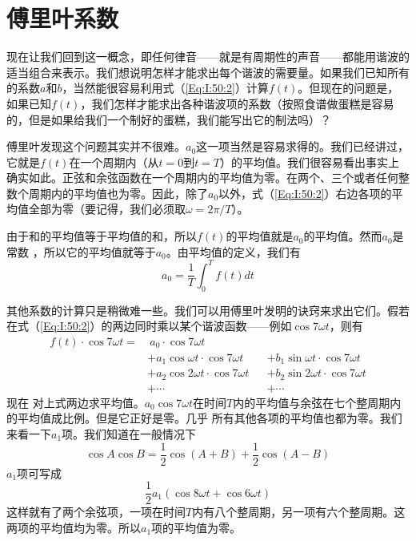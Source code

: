 \section{傅里叶系数}

现在让我们回到这一概念，即任何律音——就是有周期性的声音——都能用谐波的适当组合来表示。我们想说明怎样才能求出每个谐波的需要量。如果我们已知所有的系数$a$和$b$，当然能很容易利用式（\ref{Eq:I:50:2}）计算$f(t)$。但现在的问题是，如果已知$f(t)$，我们怎样才能求出各种谐波项的系数（按照食谱做蛋糕是容易的，但是如果给我们一个制好的蛋糕，我们能写出它的制法吗）？

傅里叶发现这个问题其实并不很难。$a_0$这一项当然是容易求得的。我们已经讲过，它就是$f(t)$在一个周期内（从$t=0$到$t=T$）的平均值。我们很容易看出事实上确实如此。正弦和余弦函数在一个周期内的平均值为零。在两个、三个或者任何整数个周期内的平均值也为零。因此，除了$a_0$以外，式（\ref{Eq:I:50:2}）右边各项的平均值全部为零（要记得，我们必须取$\omega=2\pi/T$）。

由于和的平均值等于平均值的和，所以$f(t)$的平均值就是$a_0$的平均值。然而$a_0$是常数 ，所以它的平均值就等于$a_0$。由平均值的定义，我们有
\begin{equation}
    \label{Eq:I:50:3}
    a_0 = \frac{1}{T}\int_0^T f(t)dt
\end{equation}

其他系数的计算只是稍微难一些。我们可以用傅里叶发明的诀窍来求出它们。假若在式（\ref{Eq:I:50:2}）的两边同时乘以某个谐波函数——例如$\cos7\omega t$，则有
\begin{equation}
    \label{Eq:I:50:4}
    \begin{aligned}
        f(t)\cdot\cos7\omega t = &~a_0\cdot\cos 7\omega t \\
        &+ a_1\cos\omega t\cdot \cos 7 \omega t &&+ b_1 \sin\omega t \cdot \cos 7 \omega t \\
        &+ a_2\cos2\omega t\cdot \cos 7 \omega t &&+ b_2 \sin2\omega t \cdot \cos 7 \omega t \\
        &+\cdots &&+ \cdots
    \end{aligned}
\end{equation}
现在 对上式两边求平均值。$a_0\cos 7 \omega t$在时间$T$内的平均值与余弦在七个整周期内的平均值成比例。但是它正好是零。几乎 所有其他各项的平均值也都为零。我们来看一下$a_1$项。我们知道在一般情况下
\begin{equation}
    \label{Eq:I:50:5}
    \cos A \cos B = \frac{1}{2}\cos(A+B) + \frac{1}{2}\cos(A-B)
\end{equation}
$a_1$项可写成
\begin{equation}
    \label{Eq:I:50:6}
    \frac{1}{2}a_1(\cos 8\omega t + \cos 6 \omega t)
\end{equation}
这样就有了两个余弦项，一项在时间$T$内有八个整周期，另一项有六个整周期。这两项的平均值均为零。所以$a_1$项的平均值为零。

